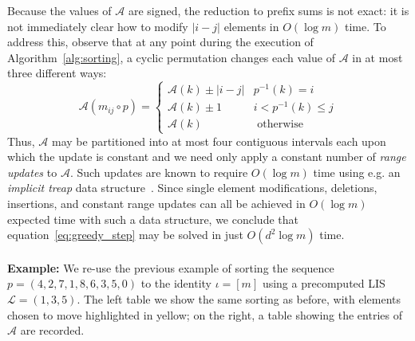 \documentclass[sn-mathphys]{sn-jnl}
\begin{document}
Because the values of $\mathcal{A}$ are signed, the reduction to prefix sums is not exact: it is not immediately clear how to modify $\lvert i - j \rvert$ elements in $O(\log m)$ time. 
To address this, observe that at any point during the execution of Algorithm~\ref{alg:sorting}, a cyclic permutation changes each value of $\mathcal{A}$ in at most three different ways: 
\[
\mathcal{A}(m_{ij} \circ p) = 
\begin{cases} 
	 \mathcal{A}(k) \pm \lvert i - j \rvert & p^{-1}(k) = i \\
	 \mathcal{A}(k) \pm 1 & i < p^{-1}(k) \leq j \\
	 \mathcal{A}(k) & \text{ otherwise }
\end{cases}
\]
Thus, $\mathcal{A}$ may be partitioned into at most four contiguous intervals each upon which the update is constant and we need only apply a constant number of \emph{range updates} to  $\mathcal{A}$. Such updates are known to require $O(\log m)$ time using e.g. an \emph{implicit treap} data structure~\cite{blelloch1998fast}. 
Since single element modifications, deletions, insertions, and constant range updates can all be achieved in $O(\log m)$ expected time with such a data structure, we conclude that equation~\eqref{eq:greedy_step} may be solved in just $O(d^2 \log m)$ time. 
\\
\\
\noindent \textbf{Example:} 
We re-use the previous example of sorting the sequence $p = (4, 2, 7, 1, 8, 6, 3, 5,0)$ to the identity $\iota = [m]$ using a precomputed LIS $\mathcal{L} = (1, 3, 5)$. The left table we show the same sorting as before, with elements chosen to move highlighted in yellow; on the right, a table showing the entries of $\mathcal{A}$ are recorded. 
\end{document}
